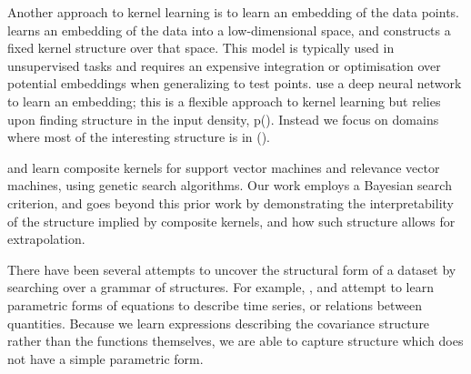 Another approach to kernel learning is to learn an embedding of the data points. 
\citet{lawrence2005probabilistic} learns an embedding of the data into a low-dimensional space, and constructs a fixed kernel structure over that space.
This model is typically used in unsupervised tasks and requires an expensive integration or optimisation over potential embeddings when generalizing to test points.
\citet{salakhutdinov2008using} use a deep neural network to learn an embedding;
this is a flexible approach to kernel learning but relies upon finding structure in the input density, p().
Instead we focus on domains where most of the interesting structure is in \function().

\citet{diosan2007evolving} and \citet{bing2010gp} learn composite kernels for support vector machines and relevance vector machines, using genetic search algorithms.
Our work employs a Bayesian search criterion, and goes beyond this prior work by demonstrating the interpretability of the structure implied by composite kernels, and how such structure allows for extrapolation.



There have been several attempts to uncover the structural form of a dataset by searching over a grammar of structures. For example, \cite{Schmidt2009b}, \cite{todorovski1997declarative} and \cite{washio1999discovering} attempt to learn parametric forms of equations to describe time series, or relations between quantities. Because we learn expressions describing the covariance structure rather than the functions themselves, we are able to capture structure which does not have a simple parametric form.

